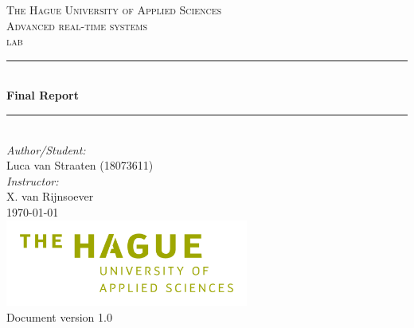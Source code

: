 \documentclass[a4paper]{article}
\begin{document}
\begin{titlepage}

\newcommand{\HRule}{\rule{\linewidth}{0.5mm}} 							%
\center 
 
\textsc{\LARGE The Hague University of Applied Sciences}\\[1cm]

\textsc{\Large Advanced real-time systems}\\[0.2cm]
\textsc{\large lab}\\[1cm] 										%
\HRule \\[0.8cm]
{ \huge \bfseries Final Report}\\[0.7cm]								%
\HRule \\[2cm]
\large
\emph{Author/Student:}\\
Luca van Straaten (18073611)\\[1.5cm]													%
\emph{Instructor:}\\
X. van Rijnsoever\\[1.5cm]										
{\large \today}\\[5cm]
\includegraphics[width=0.6\textwidth]{images/hhs.png}\\[1cm] 	%
\vfill
Document version 1.0
\end{titlepage}


\newpage
  \tableofcontents
\newpage
{}












\newpage


\end{document}
